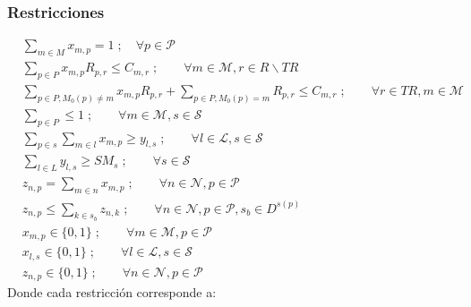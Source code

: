 \documentclass[../informe2.tex]{subfiles}
\begin{document}
\subsubsection{Restricciones}
\begin{align}
	\label{modelo1:r1} &\sum_{m \in M}x_{m,p} = 1\;; \quad \forall p \in \mathcal{P} \\
	\label{modelo1:r2} &\sum_{p \in P}x_{m,p}R_{p,r} \leq C_{m,r}\;; \qquad \forall m \in \mathcal{M}, r \in R\backslash TR \\
	\label{modelo1:r3} &\sum_{p \in P, M_0(p)\neq m}x_{m,p}R_{p,r}+\sum_{p\in P, M_0(p)=m}R_{p,r} \leq C_{m,r}\;; \qquad \forall r \in TR, m \in \mathcal{M} \\
	\label{modelo1:r4} &\sum_{p \in P} \leq 1\;; \qquad \forall m \in \mathcal{M}, s \in \mathcal{S} \\
	\label{modelo1:r5} &\sum_{p \in s}\sum_{m \in l}x_{m,p} \geq y_{l,s}\;; \qquad \forall l \in \mathcal{L}, s \in \mathcal{S} \\
	\label{modelo1:r6} &\sum_{l \in L}y_{l,s} \geq SM_{s}\;; \qquad \forall s \in \mathcal{S} \\
	\label{modelo1:r7} & z_{n,p} = \sum_{m \in n}x_{m,p}\;; \qquad \forall n \in \mathcal{N}, p \in \mathcal{P} \\
	\label{modelo1:r8} & z_{n,p} \leq \sum_{k \in s_b}z_{n,k}\;; \qquad \forall n \in \mathcal{N}, p \in \mathcal{P}, s_b \in D^{s(p)} \\
	\label{modelo1:r9} & x_{m,p} \in \{0,1\}\;; \qquad \forall m \in \mathcal{M}, p \in \mathcal{P} \\
	\label{modelo1:r10} & x_{l,s} \in \{0,1\}\;; \qquad \forall l \in \mathcal{L}, s \in \mathcal{S} \\
	\label{modelo1:r11} & z_{n,p} \in \{0,1\}\;; \qquad \forall n \in \mathcal{N}, p \in \mathcal{P}
\end{align}
\bigskip
\noindent Donde cada restricción corresponde a:
\end{document}
